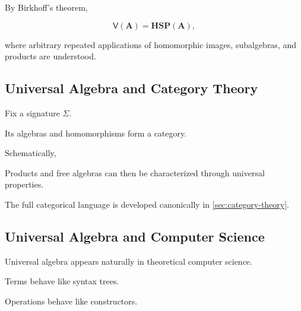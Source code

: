 By Birkhoff's theorem,

\[ \mathsf V(\mathbf A)=\mathbf{HSP}(\mathbf A), \]

where arbitrary repeated applications of homomorphic images, subalgebras,
and products are understood.

\subsection{Universal Algebra and Category Theory}
\label{subsec:universal-algebra-category}

Fix a signature \(\Sigma\).

Its algebras and homomorphisms form a category.

Schematically,

\begin{center}
\end{center}

Products and free algebras can then be characterized through universal
properties.

The full categorical language is developed canonically in
\cref{sec:category-theory}.

\subsection{Universal Algebra and Computer Science}
\label{subsec:universal-algebra-computer-science}

Universal algebra appears naturally in theoretical computer science.

Terms behave like syntax trees.

Operations behave like constructors.

